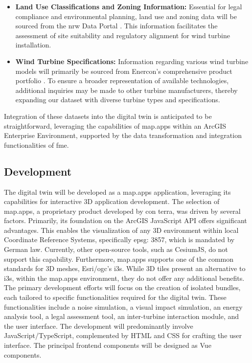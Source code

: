 \documentclass[11pt, titlepage, a4paper]{scrartcl}
\begin{document}
\begin{linenumbers}
\begin{itemize}
        \item \textbf{Land Use Classifications and Zoning Information:} Essential for legal compliance and environmental planning, land use and zoning data will be sourced from the \gls{nrw} Data Portal \cite{ministeriumfurheimatkommunalesbauunddigitalisierungdeslandesnordrhein-westfalenOpenNRW}. This information facilitates the assessment of site suitability and regulatory alignment for wind turbine installation.

        \item \textbf{Wind Turbine Specifications:} Information regarding various wind turbine models will primarily be sourced from Enercon’s comprehensive product portfolio \cite{enerconglobalgmbhENERCONWindenergieanlagenPortfolio}. To ensure a broader representation of available technologies, additional inquiries may be made to other turbine manufacturers, thereby expanding our dataset with diverse turbine types and specifications.
    \end{itemize}

    Integration of these datasets into the digital twin is anticipated to be straightforward, leveraging the capabilities of map.apps within an ArcGIS Enterprise Environment, supported by the data transformation and integration functionalities of \gls{fme}.




    \subsection{Development}
    The digital twin will be developed as a map.apps application, leveraging its capabilities for interactive 3D application development. The selection of map.apps, a proprietary product developed by con terra, was driven by several factors. Primarily, its foundation on the ArcGIS JavaScript API offers significant advantages. This  enables the visualization of any 3D environment within local Coordinate Reference Systems, specifically \gls{epsg}: 3857, which is mandated by German law. Currently, other open-source tools, such as CesiumJS, do not support this capability. Furthermore, map.apps supports one of the common standards for 3D meshes, Esri/\gls{ogc}'s \gls{i3s}. While 3D tiles present an alternative to \gls{i3s}, within the map.apps environment, they do not offer any additional benefits. The primary development efforts will focus on the creation of isolated bundles, each tailored to specific functionalities required for the digital twin. These functionalities include a noise simulation, a visual impact simulation, an energy analysis tool, a legal assessment tool, an inter-turbine interaction module, and the user interface. The development will predominantly involve JavaScript/TypeScript, complemented by HTML and CSS for crafting the user interface. The principal frontend components will be designed as Vue components.


\end{linenumbers}
\end{document}
